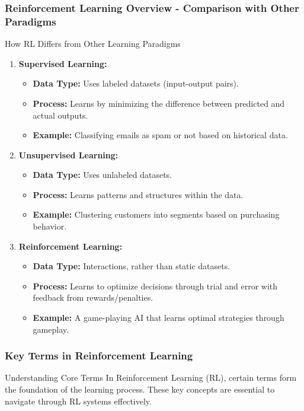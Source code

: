\documentclass[aspectratio=169]{beamer}
\begin{document}
\begin{frame}[fragile]
    \frametitle{Reinforcement Learning Overview - Comparison with Other Paradigms}
    \begin{block}{How RL Differs from Other Learning Paradigms}
        \begin{enumerate}
            \item \textbf{Supervised Learning:}
            \begin{itemize}
                \item \textbf{Data Type:} Uses labeled datasets (input-output pairs).
                \item \textbf{Process:} Learns by minimizing the difference between predicted and actual outputs.
                \item \textbf{Example:} Classifying emails as spam or not based on historical data.
            \end{itemize}

            \item \textbf{Unsupervised Learning:}
            \begin{itemize}
                \item \textbf{Data Type:} Uses unlabeled datasets.
                \item \textbf{Process:} Learns patterns and structures within the data.
                \item \textbf{Example:} Clustering customers into segments based on purchasing behavior.
            \end{itemize}

            \item \textbf{Reinforcement Learning:}
            \begin{itemize}
                \item \textbf{Data Type:} Interactions, rather than static datasets.
                \item \textbf{Process:} Learns to optimize decisions through trial and error with feedback from rewards/penalties.
                \item \textbf{Example:} A game-playing AI that learns optimal strategies through gameplay.
            \end{itemize}
        \end{enumerate}
    \end{block}
\end{frame}

\begin{frame}[fragile]
    \frametitle{Key Terms in Reinforcement Learning}
    \begin{block}{Understanding Core Terms}
        In Reinforcement Learning (RL), certain terms form the foundation of the learning process. These key concepts are essential to navigate through RL systems effectively.
    \end{block}
\end{frame}
\end{document}
